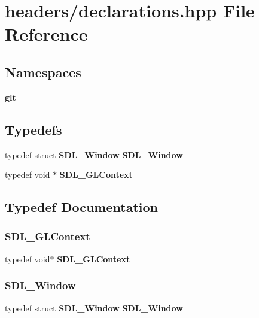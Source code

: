 \section{headers/declarations.hpp File Reference}
\label{declarations_8hpp}
\subsection*{Namespaces}
\begin{DoxyCompactItemize}
\item 
 \textbf{ glt}
\end{DoxyCompactItemize}
\subsection*{Typedefs}
\begin{DoxyCompactItemize}
\item 
typedef struct \textbf{ S\+D\+L\+\_\+\+Window} \textbf{ S\+D\+L\+\_\+\+Window}
\item 
typedef void $\ast$ \textbf{ S\+D\+L\+\_\+\+G\+L\+Context}
\end{DoxyCompactItemize}


\subsection{Typedef Documentation}
\mbox{\label{declarations_8hpp_a0d64dcf67c9685d09cbe051448e1b3f3}} 
\subsubsection{SDL\_GLContext}
{\footnotesize\ttfamily typedef void$\ast$ \textbf{ S\+D\+L\+\_\+\+G\+L\+Context}}

\mbox{\label{declarations_8hpp_a55a196c7d3b8497538632c79ae1e6392}} 
\subsubsection{SDL\_Window}
{\footnotesize\ttfamily typedef struct \textbf{ S\+D\+L\+\_\+\+Window} \textbf{ S\+D\+L\+\_\+\+Window}}

